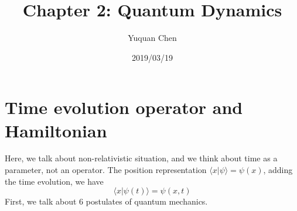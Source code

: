 \documentclass[UTF8,12pt]{article} %
\numberwithin{equation}{section}
\begin{document}
\title{Chapter 2: Quantum Dynamics}
\author{Yuquan Chen}
\date{2019/03/19} %
\maketitle

\section{Time evolution operator and Hamiltonian}

Here, we talk about non-relativistic situation, and we think about time as a parameter, not an operator. The position representation $\langle x|\psi\rangle = \psi(x)$, adding the time evolution, we have $$\langle x|\psi(t)\rangle = \psi(x,t)$$
First, we talk about 6 postulates of quantum mechanics.\\
\end{document}
